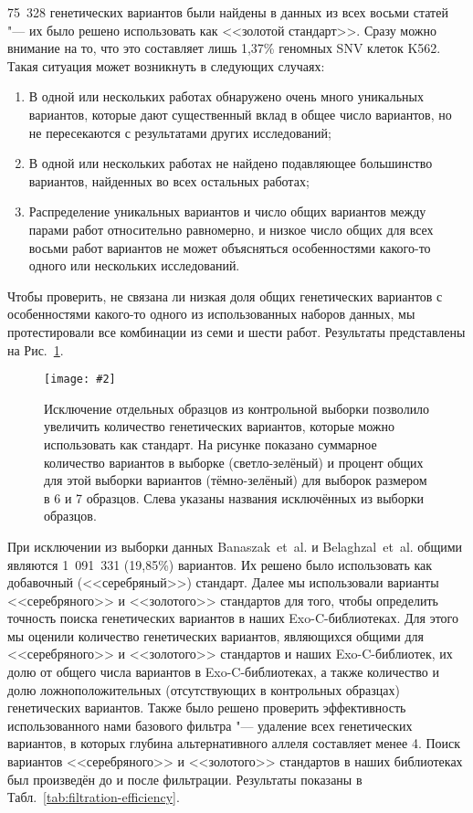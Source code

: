 \documentclass[a4paper,14pt]{extarticle}
\newcommand{\bigfiga}[5]{
\begin{figure}[#1]
\centering
\texttt{[image: \#2]}
\caption{\label{#3}#4}
\end{figure}
}
\newcommand{\ris}[1]{Рис.~\ref{#1}}
\newcommand{\tabl}[1]{Табл.~\ref{#1}}
\begin{document}
75~328 генетических вариантов были найдены в данных из всех восьми статей "--- их было решено использовать как <<золотой стандарт>>.
Сразу можно внимание на то, что это составляет лишь 1,37\% геномных SNV клеток K562.
Такая ситуация может возникнуть в следующих случаях:

\begin{enumerate}
\item В одной или нескольких работах обнаружено очень много уникальных вариантов, которые дают существенный вклад в общее число вариантов, но не пересекаются с результатами других исследований;
\item В одной или нескольких работах не найдено подавляющее большинство вариантов, найденных во всех остальных работах;
\item Распределение уникальных вариантов и число общих вариантов между парами работ относительно равномерно, и низкое число общих для всех восьми работ вариантов не может объясняться особенностями какого-то одного или нескольких исследований.
\end{enumerate}

Чтобы проверить, не связана ли низкая доля общих генетических вариантов с особенностями какого-то одного из использованных наборов данных, мы протестировали все комбинации из семи и шести работ.
Результаты представлены на \ris{fig:exclusion}.

\bigfiga{hp!}{Exclusion_6.pdf}{fig:exclusion}{Исключение отдельных образцов из контрольной выборки позволило увеличить количество генетических вариантов, которые можно использовать как стандарт. На рисунке показано суммарное количество вариантов в выборке (светло-зелёный) и процент общих для этой выборки вариантов (тёмно-зелёный) для выборок размером в 6 и 7 образцов. Слева указаны названия исключённых из выборки образцов.}{0.7}

При исключении из выборки данных Banaszak~et~al. и Belaghzal~et~al. общими являются 1~091~331 (19,85\%) вариантов.
Их решено было использовать как добавочный (<<серебряный>>) стандарт.
Далее мы использовали варианты <<серебряного>> и <<золотого>> стандартов для того, чтобы определить точность поиска генетических вариантов в наших Exo-C\hyp{}библиотеках.
Для этого мы оценили количество генетических вариантов, являющихся общими для <<серебряного>> и <<золотого>> стандартов и наших Exo-C\hyp{}библиотек, их долю от общего числа вариантов в Exo-C\hyp{}библиотеках, а также количество и долю ложноположительных (отсутствующих в контрольных образцах) генетических вариантов.
Также было решено проверить эффективность использованного нами базового фильтра "--- удаление всех генетических вариантов, в которых глубина альтернативного аллеля составляет менее 4.
Поиск вариантов <<серебряного>> и <<золотого>> стандартов в наших библиотеках был произведён до и после фильтрации.
Результаты показаны в \tabl{tab:filtration-efficiency}.
\end{document}
